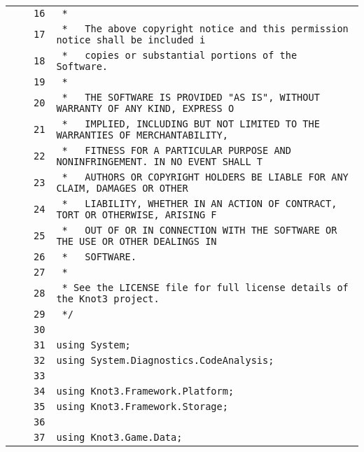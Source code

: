\documentclass[a4paper,10pt]{article}
\begin{document}
\begin{longtable}[l]{lrrl}
\cellcolor{gray} &  & \verb~16~ & \verb~ *~\\
\cellcolor{gray} &  & \verb~17~ & \verb~ *   The above copyright notice and this permission notice shall be included i~\\
\cellcolor{gray} &  & \verb~18~ & \verb~ *   copies or substantial portions of the Software.~\\
\cellcolor{gray} &  & \verb~19~ & \verb~ *~\\
\cellcolor{gray} &  & \verb~20~ & \verb~ *   THE SOFTWARE IS PROVIDED "AS IS", WITHOUT WARRANTY OF ANY KIND, EXPRESS O~\\
\cellcolor{gray} &  & \verb~21~ & \verb~ *   IMPLIED, INCLUDING BUT NOT LIMITED TO THE WARRANTIES OF MERCHANTABILITY,~\\
\cellcolor{gray} &  & \verb~22~ & \verb~ *   FITNESS FOR A PARTICULAR PURPOSE AND NONINFRINGEMENT. IN NO EVENT SHALL T~\\
\cellcolor{gray} &  & \verb~23~ & \verb~ *   AUTHORS OR COPYRIGHT HOLDERS BE LIABLE FOR ANY CLAIM, DAMAGES OR OTHER~\\
\cellcolor{gray} &  & \verb~24~ & \verb~ *   LIABILITY, WHETHER IN AN ACTION OF CONTRACT, TORT OR OTHERWISE, ARISING F~\\
\cellcolor{gray} &  & \verb~25~ & \verb~ *   OUT OF OR IN CONNECTION WITH THE SOFTWARE OR THE USE OR OTHER DEALINGS IN~\\
\cellcolor{gray} &  & \verb~26~ & \verb~ *   SOFTWARE.~\\
\cellcolor{gray} &  & \verb~27~ & \verb~ *~\\
\cellcolor{gray} &  & \verb~28~ & \verb~ * See the LICENSE file for full license details of the Knot3 project.~\\
\cellcolor{gray} &  & \verb~29~ & \verb~ */~\\
\cellcolor{gray} &  & \verb~30~ & \verb~~\\
\cellcolor{gray} &  & \verb~31~ & \verb~using System;~\\
\cellcolor{gray} &  & \verb~32~ & \verb~using System.Diagnostics.CodeAnalysis;~\\
\cellcolor{gray} &  & \verb~33~ & \verb~~\\
\cellcolor{gray} &  & \verb~34~ & \verb~using Knot3.Framework.Platform;~\\
\cellcolor{gray} &  & \verb~35~ & \verb~using Knot3.Framework.Storage;~\\
\cellcolor{gray} &  & \verb~36~ & \verb~~\\
\cellcolor{gray} &  & \verb~37~ & \verb~using Knot3.Game.Data;~\\

\end{longtable}
\end{document}
